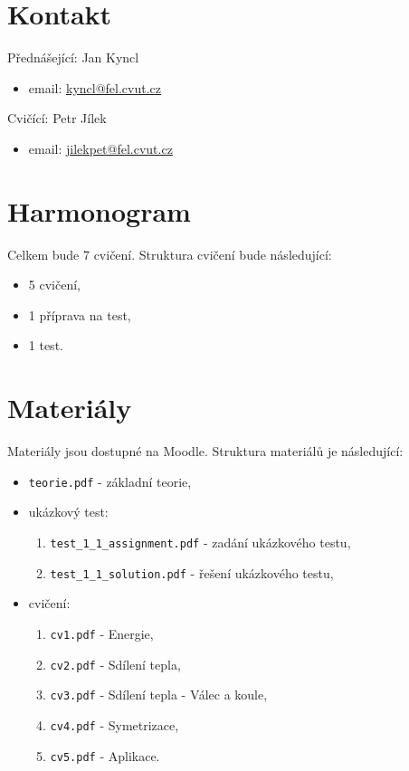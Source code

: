 \documentclass{article}
\begin{document}
\maketitle
\tableofcontents
\newpage




\section{Kontakt}
Přednášející: Jan Kyncl
\begin{itemize}
    \item email: \href{mailto:kyncl@fel.cvut.cz}{kyncl@fel.cvut.cz}
\end{itemize}

Cvičící: Petr Jílek
\begin{itemize}
    \item email: \href{mailto:jilekpet@fel.cvut.cz}{jilekpet@fel.cvut.cz}
\end{itemize}




\section{Harmonogram}
Celkem bude 7 cvičení. Struktura cvičení bude následující:
\begin{itemize}
    \item 5 cvičení,
    \item 1 příprava na test,
    \item 1 test.
\end{itemize}




\section{Materiály}
Materiály jsou dostupné na Moodle. Struktura materiálů je následující:
\begin{itemize}
    \item \texttt{teorie.pdf} - základní teorie,
    \item ukázkový test:
          \begin{enumerate}
              \item \texttt{test\_1\_1\_assignment.pdf} - zadání ukázkového testu,
              \item \texttt{test\_1\_1\_solution.pdf} - řešení ukázkového testu,
          \end{enumerate}
    \item cvičení:
          \begin{enumerate}
              \item \texttt{cv1.pdf} - Energie,
              \item \texttt{cv2.pdf} - Sdílení tepla,
              \item \texttt{cv3.pdf} - Sdílení tepla - Válec a koule,
              \item \texttt{cv4.pdf} - Symetrizace,
              \item \texttt{cv5.pdf} - Aplikace.
          \end{enumerate}
\end{itemize}
\end{document}
